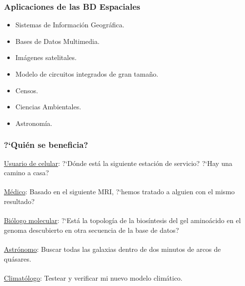 \documentclass[a4paper,12pt,oneside]{report}
\begin{document}
\subsubsection*{Aplicaciones de las BD Espaciales}
\begin{itemize}
\item Sistemas de Informaci\'on Geogr\'afica.
\item Bases de Datos Multimedia.
\item Im\'agenes satelitales.
\item Modelo de circuitos integrados de gran tama\~no.
\item Censos.
\item Ciencias Ambientales.
\item Astronom\'ia.
\end{itemize}
\subsubsection*{?`Qui\'en se beneficia?}
\underline{Usuario de celular}: ?`D\'onde est\'a la siguiente estaci\'on de servicio? ?`Hay una camino a casa?\\
\ \\
\underline{M\'edico}: Basado en el siguiente MRI, ?`hemos tratado a alguien con el mismo resultado?\\
\ \\
\underline{Bi\'ologo molecular}: ?`Est\'a la topolog\'ia de la bios\'intesis del gel amino\'acido en el genoma descubierto 	en otra secuencia de la base de datos?\\
\ \\
\underline{Astr\'onomo}: Buscar todas las galaxias dentro de dos minutos de arcos de qu\'asares.\\
\ \\
\underline{Climat\'ologo}: Testear y verificar mi nuevo modelo clim\'atico.
\end{document}

